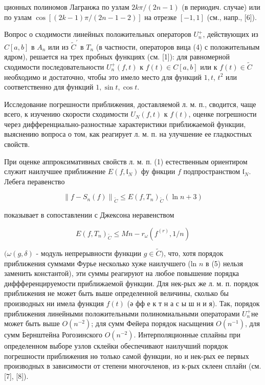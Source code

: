 \documentclass[10pt]{article}
\begin{document}
ционных полиномов Лагранжа по узлам $2 k \pi /(2 n-1)$ (в периодич. случае) или по узлам $\cos [(2 k-1) \pi /(2 n-1-2)]$ на отрезке $[-1,1]$ (см., напр., [6]).



Вопрос о сходимости линейных положительных операторов $U_{n}^{+}$, действующих из $C[a, b]$ в $A_{n}$ или из $\tilde{C}^{\prime}$ в $T_{n}$ (в частности, операторов вица (4) с положительным ядром), решается на трех пробных функциях (см. [1]): для равномерной сходимости последовательности $U_{n}^{+}(f, t)$ к $f(t) \in C[a, b]$ или к $f(t) \in \tilde{C}$ необходимо и достаточно, чтобы это имело место для функций $1, t$, $t^{2}$ или соответственно для функций $1, \sin t, \cos t$.



Исследование погрешности приближения, доставляемой л. м. п., сводится, чаще всего, к изучению скорости сходимости $U_{N}(f, t)$ к $f(t)$, оценке погрешности через дифференциально-разностные характеристики приближаемой функции, выяснению вопроса о том, как реагирует л. м. п. на улучшение ее гладкостных свойств.



При оценке аппроксимативных свойств л. м. п. (1) естественным ориентиром служит наилучшее приближение $E\left(f, \mathfrak{l}_{N}\right)$ фу фнкции $f$ подпространством $\mathfrak{l}_{N}$. Лебега перавенство



\[

\left\|f-S_{n}(f)\right\|_{\tilde{C}} \leqslant E\left(f, T_{n}\right)_{\tilde{C}}(\ln n+3)

\]



показывает в сопоставлении с Джексона неравенством



\[

E\left(f, T_{n}\right)_{\tilde{C}} \leqslant M n-r_{\omega}\left(f^{(r)}, 1 / n\right)

\]



$(\omega(g, \delta)$ - модуль непрерывности функции $g \in \tilde{C})$, что, хотя порядок приближения суммами Фурье несколько хуже наилучшего (ln $n$ в (5) нельзя заменить константой), эти суммы реагируют на любое повышение порядка диффференцируемости приближаемой функции. Для нек-рых же л. м. п. порядок приближения не может быть выше определенной величины, сколько бы производных ни имела функция $f(t)$ (ә фф е к т н а с ы ш н и я). Так, порядок приближения линейными положительными полиномиальными операторами $U_{n}^{+}$не может быть выше $O\left(n^{-2}\right)$; для сумм Фейера порядок насыщения $O\left(n^{-1}\right)$, для сумм Бернштейна Рогозинского $O\left(n^{-2}\right)$. Интерполяционные сплайны при определенном выборе узлов склейки обеспечивают наилучший порядок погрешности приближения нө только самой функции, но и нек-рых ее первых производных в зависимости от степени многочленов, из к-рых склеен сплайн (см. [7], [8]).
\end{document}
